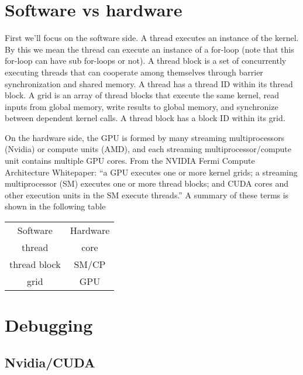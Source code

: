 \documentclass[a4paper,11pt]{article}
\begin{document}
\section{Software vs hardware}
First we'll focus on the software side. A thread executes an instance of the kernel. By this we mean the thread can execute an instance of a for-loop (note that this for-loop can have sub for-loops or not). A thread block is a set of concurrently executing threads that can cooperate among themselves through barrier synchronization and shared memory. A thread has a thread ID within its thread block. A grid is an array of thread blocks that execute the same kernel, read inputs from global memory, write results to global memory, and synchronize between dependent kernel calls. A thread block has a block ID within its grid.

On the hardware side, the GPU is formed by many streaming multiprocessors (Nvidia) or compute units (AMD), and each streaming multiprocessor/compute unit contains multiple GPU cores. From the NVIDIA Fermi Compute Architecture Whitepaper:
``a GPU executes one or more kernel grids; a streaming multiprocessor (SM) executes one or more thread blocks;
and CUDA cores and other execution units in the SM execute threads.'' A summary of these terms is shown in the following table

\begin{center}
    \begin{tabular}{c | c }
        Software & Hardware \\
        \hhline{=|=}
        thread & core \\ 
        thread block & SM/CP \\
        grid & GPU \\
    \end{tabular}
\end{center}

\section{Debugging}

\subsection{Nvidia/CUDA}
\end{document}
